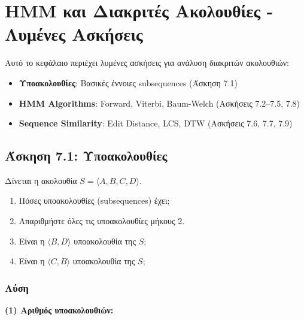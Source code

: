 
\chapter{HMM και Διακριτές Ακολουθίες - Λυμένες Ασκήσεις}
\label{ch:hmm-sequences-exercises}

Αυτό το κεφάλαιο περιέχει λυμένες ασκήσεις για ανάλυση διακριτών ακολουθιών:
\begin{itemize}
    \item \textbf{Υποακολουθίες}: Βασικές έννοιες subsequences (Άσκηση 7.1)
    \item \textbf{HMM Algorithms}: Forward, Viterbi, Baum-Welch (Ασκήσεις 7.2--7.5, 7.8)
    \item \textbf{Sequence Similarity}: Edit Distance, LCS, DTW (Ασκήσεις 7.6, 7.7, 7.9)
\end{itemize}

\section{Άσκηση 7.1: Υποακολουθίες}

\begin{formulabox}[Εκφώνηση]
Δίνεται η ακολουθία $S = \langle A, B, C, D \rangle$.

\begin{enumerate}
    \item Πόσες υποακολουθίες (subsequences) έχει;
    \item Απαριθμήστε όλες τις υποακολουθίες μήκους 2.
    \item Είναι η $\langle B, D \rangle$ υποακολουθία της $S$;
    \item Είναι η $\langle C, B \rangle$ υποακολουθία της $S$;
\end{enumerate}
\end{formulabox}

\subsection*{Λύση}

\textbf{(1) Αριθμός υποακολουθιών:}

